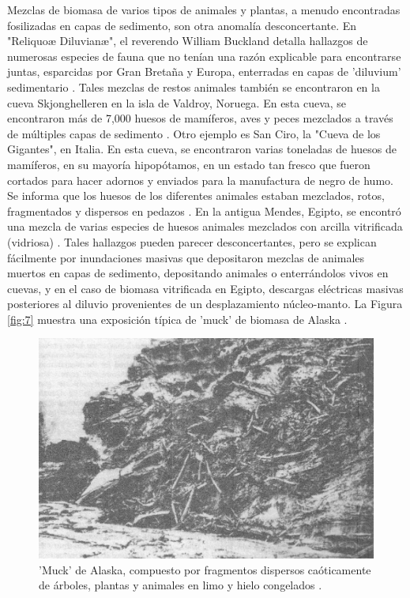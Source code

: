 \documentclass[10pt,twocolumn,letterpaper]{article}
\begin{document}
Mezclas de biomasa de varios tipos de animales y plantas, a menudo encontradas fosilizadas en capas de sedimento, son otra anomalía desconcertante. En "Reliquoæ Diluvianæ", el reverendo William Buckland detalla hallazgos de numerosas especies de fauna que no tenían una razón explicable para encontrarse juntas, esparcidas por Gran Bretaña y Europa, enterradas en capas de 'diluvium' sedimentario \cite{58}. Tales mezclas de restos animales también se encontraron en la cueva Skjonghelleren en la isla de Valdroy, Noruega. En esta cueva, se encontraron más de 7,000 huesos de mamíferos, aves y peces mezclados a través de múltiples capas de sedimento \cite{59}. Otro ejemplo es San Ciro, la "Cueva de los Gigantes", en Italia. En esta cueva, se encontraron varias toneladas de huesos de mamíferos, en su mayoría hipopótamos, en un estado tan fresco que fueron cortados para hacer adornos y enviados para la manufactura de negro de humo. Se informa que los huesos de los diferentes animales estaban mezclados, rotos, fragmentados y dispersos en pedazos \cite{60,61}. En la antigua Mendes, Egipto, se encontró una mezcla de varias especies de huesos animales mezclados con arcilla vitrificada (vidriosa) \cite{57}. Tales hallazgos pueden parecer desconcertantes, pero se explican fácilmente por inundaciones masivas que depositaron mezclas de animales muertos en capas de sedimento, depositando animales o enterrándolos vivos en cuevas, y en el caso de biomasa vitrificada en Egipto, descargas eléctricas masivas posteriores al diluvio provenientes de un desplazamiento núcleo-manto. La Figura \ref{fig:7} muestra una exposición típica de 'muck' de biomasa de Alaska \cite{56}.

\begin{figure}[t]
\begin{center}
   \includegraphics[width=1\linewidth]{muck-crop.jpeg}
\end{center}
   \caption{'Muck' de Alaska, compuesto por fragmentos dispersos caóticamente de árboles, plantas y animales en limo y hielo congelados \cite{146}.}
\label{fig:7}
\label{fig:onecol}
\end{figure}
\end{document}
